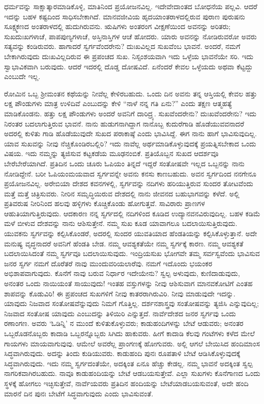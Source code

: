 \vskip 0.2cm 

ಧರ್ಮವನ್ನು ಸಾಕ್ಷಾತ್ಕಾರಮಾಡಿಕೊಳ್ಳಿ, ಮಾತಿನಿಂದ ಪ್ರಯೋಜನವಿಲ್ಲ. ಇದೇ\break ವೇದಾಂತದ ಬೋಧನೆಯ ಪಲ್ಲವಿ. ಆದರೆ ಇದನ್ನು ಬಹಳ ಕಷ್ಟದಿಂದ ಸಾಧಿಸಬೇಕಾಗಿದೆ. ಮಾನವಜೀವಿಯ ಹೃದಯಾಂತರಾಳದಲ್ಲಿರುವ ಪುರಾಣ ಪುರುಷನು ಸೂಕ್ಷ್ಮಕಣದ ಅಂತರಾಳದಲ್ಲಿ ಹುದುಗಿರುವನು. ಋಷಿಗಳು ಅಂತರಂಗ ವೀಕ್ಷಣೆಯಿಂದ ಅವನನ್ನು ಅರಿತರು; ಸುಖದುಃಖಗಳಾಚೆ, ಪಾಪಪುಣ್ಯಗಳಾಚೆ, ಅಸ್ತಿನಾಸ್ತಿಗಳ ಆಚೆ ಹೋದರು. ಯಾರು ಅವನನ್ನು ನೋಡಿರುವರೋ ಅವರು ಸತ್ಯವನ್ನು ಕಂಡಿರುವರು. ಹಾಗಾದರೆ ಸ್ವರ್ಗವೆಂದರೇನು? ದುಃಖವಿಲ್ಲದ ಸುಖವೆಂಬ ಭಾವನೆ. ಅಂದರೆ, ನಮಗೆ ಬೇಕಾಗಿರುವುದು ದುಃಖವಿಲ್ಲದಿರುವ ಈ ಪ್ರಪಂಚದ ಸುಖ. ನಿಸ್ಸಂಶಯವಾಗಿ ಇದು ಒಳ್ಳೆಯ ಭಾವನೆಯೇ ಸರಿ. ಇದು ಸ್ವಾಭಾವಿಕವಾಗಿ ಬರುವುದು. ಆದರೆ ಇದರಲ್ಲಿ ದೊಡ್ಡ ದೋಷವಿದೆ. ಏನೆಂದರೆ ಕೇವಲ ಒಳ್ಳೆಯದು ಅಥವಾ ಕೆಟ್ಟದ್ದು ಎಂಬುದೇ ಇಲ್ಲ.

\vskip 0.2cm 

ರೋಮಿನ ಒಬ್ಬ ಶ‍್ರೀಮಂತನ ಕಥೆಯನ್ನು ನೀವೆಲ್ಲ ಕೇಳಿರಬಹುದು. ಒಂದು ದಿನ ಅವನು ತನ್ನ ಆಸ್ತಿಯಲ್ಲಿ ಕೇವಲ ಹತ್ತು ಲಕ್ಷ ಪೌಂಡುಗಳು ಮಾತ್ರ ಉಳಿದಿವೆ ಎಂಬುದನ್ನು ಕೇಳಿ “ನಾಳೆ ನನ್ನ ಗತಿ ಏನು?” ಎಂದು ತಕ್ಷಣ ಆತ್ಮಹತ್ಯೆ ಮಾಡಿಕೊಂಡನು. ಹತ್ತು ಲಕ್ಷ ಪೌಂಡುಗಳು ಅಂದರೆ ಅವನಿಗೆ ದಾರಿದ್ರ್ಯ. ಸುಖವೆಂದರೇನು? ದುಃಖವೆಂದರೇನು? ಇದು ನಿರಂತರ ಬದಲಾಗುತ್ತಿರುವ ಭಾವನೆ. ನಾನು ಹುಡುಗನಾಗಿದ್ದಾಗ ನಾನೊಬ್ಬ ಕುದುರೆಗಾಡಿ ಹೊಡೆಯುವವನಾದರೆ ಅದರಲ್ಲಿ ಕುಳಿತು ಗಾಡಿ ಹೊಡೆಯುವುದೇ ಸುಖದ ಪರಾಕಾಷ್ಠೆ ಎಂದು ಭಾವಿಸಿದ್ದೆ. ಈಗ ನಾನು ಹಾಗೆ ಭಾವಿಸುವುದಿಲ್ಲ. ಯಾವ ಸುಖವನ್ನು ನೀವು ನೆಚ್ಚಿಕೊಂಡಿರಬಲ್ಲಿರಿ? ಇದು ನಾವೆಲ್ಲ ಅರ್ಥಮಾಡಿಕೊಳ್ಳುವುದಕ್ಕೆ ಪ್ರಯತ್ನಿಸಬೇಕಾದ ಒಂದು ವಿಷಯ. ಇದು ನಮ್ಮನ್ನು ತ್ಯಜಿಸುವ ಕಟ್ಟಕಡೆಯ ಮೂಢನಂಬಿಕೆ. ಪ್ರತಿಯೊಬ್ಬನ ಸುಖದ ಆದರ್ಶವೂ ಬೇರೆಬೇರೆಯಾಗಿದೆ. ಪ್ರತಿದಿನ ಒಂದು ಚೂರು ಓಪಿಯಂ ತಿನ್ನದೆ ಇದ್ದರೆ ಸಂತೋಷವೇ ಇಲ್ಲದ ಒಬ್ಬನನ್ನು ನಾನು ನೋಡಿದ್ದೇನೆ. ಬರೀ ಓಪಿಯಂಮಯವಾದ ಸ್ವರ್ಗವನ್ನೇ ಅವನು ಕನಸು ಕಾಣಬಹುದು. ಅವನ ಸ್ವರ್ಗದಿಂದ ನನಗೇನೂ ಪ್ರಯೋಜನವಿಲ್ಲ. ಅರೇಬಿಯಾ ದೇಶದ ಕವನಗಳಲ್ಲಿ, ಸ್ವರ್ಗವನ್ನು ನದಿಗಳು ಹರಿಯುತ್ತಿರುವ ಸುಂದರ ತೋಟವೆಂದು ಮತ್ತೆ ಮತ್ತೆ ಚಿತ್ರಿಸುವರು. ನೀರಿನ ಸಮೃದ್ಧಿಯಿರುವ ದೇಶದಲ್ಲಿ ನಾನು ಜೀವನದ ಬಹುಭಾಗವನ್ನು ಕಳೆದೆ. ಅಲ್ಲಿ ಪ್ರತಿವರುಷ ನೀರಿನಿಂದ ಹಲವು ಹಳ್ಳಿಗಳು ಕೊಚ್ಚಿಕೊಂಡು ಹೋಗುತ್ತವೆ. ಸಾವಿರಾರು ಪ್ರಾಣಗಳ ಆಹುತಿಯಾಗುತ್ತಿರುವುದು. ಆದಕಾರಣ ನನ್ನ ಸ್ವರ್ಗದಲ್ಲಿ ನದಿಗಳಿಂದ ಕೂಡಿದ ಉದ್ಯಾನವನವಿರುವುದಿಲ್ಲ. ಬಹಳ ಕಡಿಮೆ ಮಳೆ ಬೀಳುವ ದೇಶವನ್ನು ನಾನು ಆಶಿಸುತ್ತೇನೆ. ನಮ್ಮ ಸುಖ ಕೂಡ ಯಾವಾಗಲೂ ಬದಲಾಯಿಸುತ್ತಿರುವುದು. ಯುವಕನು ಸ್ವರ್ಗವನ್ನು ಕಲ್ಪಿಸಿಕೊಂಡರೆ, ಅದರಲ್ಲಿ ಸುಂದರ ಯುವತಿಯಾದ ಹೆಂಡತಿಯನ್ನು ಕಲ್ಪಿಸಿಕೊಳ್ಳುತ್ತಾನೆ. ಅದೇ ಮನುಷ್ಯ ವೃದ್ಧನಾದರೆ ಅವನಿಗೆ ಹೆಂಡತಿ ಬೇಡ. ನಮ್ಮ ಆವಶ್ಯಕತೆಯೇ ನಮ್ಮ ಸ್ವರ್ಗಕ್ಕೆ ಕಾರಣ. ನಮ್ಮ ಆವಶ್ಯಕತೆ ಬದಲಾಯಿಸಿದಂತೆ ನಮ್ಮ ಸ್ವರ್ಗವೂ ಬದಲಾಯಿಸುವುದು. ಇಂದ್ರಿಯಸುಖ ಭೋಗವೇ ತಮ್ಮ ಸರ್ವಸ್ವವೆಂದು ಭಾವಿಸುವ ಜನರ ಸ್ವರ್ಗ ನಮಗೆ ದೊರೆತರೆ ನಾವು ಮುಂದುವರಿಯಲಾರೆವು. ನಮಗೆ ಇದೊಂದು ಭಯಂಕರ ಅಭಿಶಾಪವಾಗುವುದು. ಕೊನೆಗೆ ನಾವು ಬರುವ ನಿರ್ಧಾರ ಇದೇಯೇನು? ಸ್ವಲ್ಪ ಅಳುವುದು, ಕುಣಿದಾಡುವುದು, ಅನಂತರ ಒಂದು ನಾಯಿಯಂತೆ ಸಾಯುವುದು! ಇಂತಹ ವಸ್ತುಗಳನ್ನು ನೀವು ಆಶಿಸುವಾಗ ಮಾನವಕೋಟಿಗೆ ಎಂತಹ ಶಾಪವನ್ನು ಕೊಡುವಿರಿ! ಈ ಪ್ರಪಂಚದ ಸುಖಗಳಿಗೆ ನೀವು ಕಾತರರಾಗಿರುವಿರಿ. ನೀವು ಮಾಡುವುದೇ ಇದನ್ನು. ಯಾವುದು ನಿಜವಾದ ಸಂತೋಷವೆನ್ನುವುದು ನಿಮಗೆ ಗೊತ್ತಿಲ್ಲ. ದರ್ಶನಶಾಸ್ತ್ರವು ಸಂತೋಷವನ್ನು ತ್ಯಜಿಸಿ ಎನ್ನುವುದಿಲ್ಲ; ನಿಜವಾದ ಸಂತೋಷ ಯಾವುದು ಎಂಬುದನ್ನು ತಿಳಿಯಿರಿ ಎನ್ನುತ್ತದೆ. ನಾರ್ವೆದೇಶದ ಜನರ ಸ್ವರ್ಗವು ಒಂದು ರಣಾಂಗಣ. ಅವರು ‘ಓಡಿನ್ನಿ’ ನ ಮುಂದೆ ಕುಳಿತುಕೊಳ್ಳುವರು; ಕಾಡುಹಂದಿಗಳನ್ನು ಬೇಟೆ ಆಡುವರು; ಅನಂತರ ಒಬ್ಬರೊಡನೊಬ್ಬರು ಕಾದಾಡಿ ಒಬ್ಬರನ್ನೊಬ್ಬರು ಸಿಗಿದು ಹಾಕುವರು. ಹೀಗೆ ಕಾದಾಡಿ ಕೆಲವು ಗಂಟೆಗಳು ಕಳೆದ ಮೇಲೆ ಗಾಯಗಳು ಮಾಯವಾಗುವುವು. ಆಮೇಲೆ ಅವರೆಲ್ಲ ಪ್ರಾಂಗಣಕ್ಕೆ ಹೋಗುವರು. ಅಲ್ಲಿ ಆಗಲೆ ಬೇಯಿಸಿದ ಹಂದಿಮಾಂಸ ಸಿದ್ಧವಾಗಿರುವುದು. ಅದನ್ನು ತಿಂದು ಕುಡಿಯುವರು. ಕಾಡುಹಂದಿ ಪುನಃ ರೂಪತಾಳಿ ಬೇಟೆ ಆಡಿಸಿಕೊಳ್ಳುವುದಕ್ಕೆ ಸಿದ್ಧವಾಗಿರುವುದು. ಇದು ನಮ್ಮ ಸ್ವರ್ಗದಂತೆಯೇ, ಅದಕ್ಕಿಂತ ಏನೂ ಹೆಚ್ಚು ಕೇಡಲ್ಲ. ನಮ್ಮ ಭಾವನೆ ಅದಕ್ಕಿಂತ ಸ್ವಲ್ಪ ನಾಗರಿಕವಾಗಿರಬಹುದು. ನಾವೂ ಕಾಡುಹಂದಿಯನ್ನು ಬೇಟೆ ಆಡಬಯಸುತ್ತೇವೆ. ಎಲ್ಲಾ ಸುಖಗಳು ಕೊನೆಗಾಣದ ಒಂದು ಸ್ಥಳಕ್ಕೆ ಹೋಗಲು ಇಚ್ಛಿಸುತ್ತೇವೆ, ನಾರ್ವೆಯವರು ಪ್ರತಿದಿನ ಹಂದಿಯನ್ನು ಬೇಟೆಯಾಡಬಯಸುವಂತೆ, ಅದೇ ಹಂದಿ ಮಾರನೆ ದಿನ ಪುನಃ ಬೇಟೆಗೆ ಸಿದ್ಧವಾಗುವುದು ಎಂದು ಭಾವಿಸುವಂತೆ.

